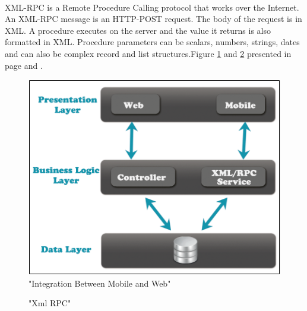 \documentclass[12pt,a4paper,class,twoside,openany]{report}
\begin{document}
{\paragraph*{\hspace{.9 cm} } XML-RPC is a Remote Procedure Calling protocol that works over the Internet.
An XML-RPC message is an HTTP-POST request. The body of the request is in XML. A procedure executes on the server and the value it returns is also formatted in XML.
Procedure parameters can be scalars, numbers, strings, dates and can also be complex record and list structures.Figure \ref{fg:7-2} and \ref{fg:7-3} presented in page \pageref{fg:7-2} and \pageref{fg:7-3}.
\begin{figure}
\begin{center}
\includegraphics[height=3.5 in]{7-2}
\caption{"Integration Between Mobile and Web"}
\label{fg:7-2}
\end{center}
\end{figure}

\begin{figure}
\begin{center}
\caption{"Xml RPC"}
\label{fg:7-3}
\end{center}
\end{figure}
}
\end{document}
